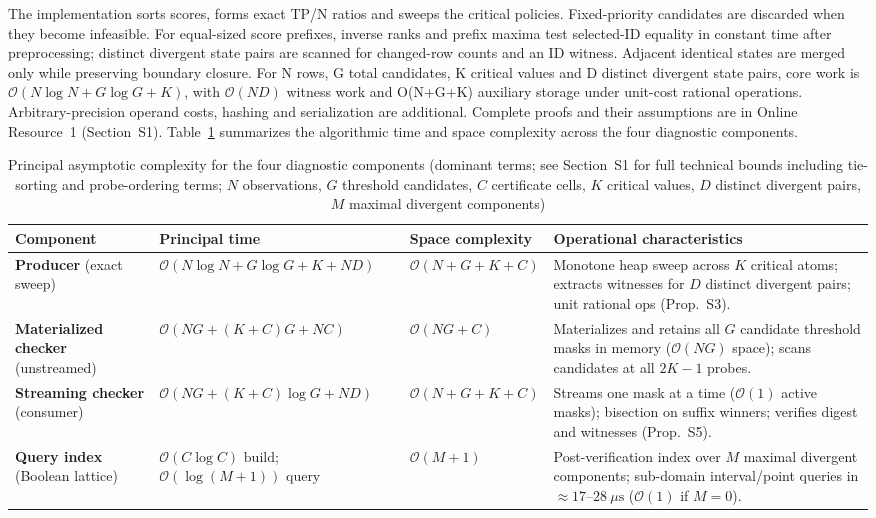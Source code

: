 \documentclass[11pt,a4paper]{article}
\begin{document}
The implementation sorts scores, forms exact TP/N ratios and sweeps the critical policies. Fixed-priority candidates are discarded when they become infeasible. For equal-sized score prefixes, inverse ranks and prefix maxima test selected-ID equality in constant time after preprocessing; distinct divergent state pairs are scanned for changed-row counts and an ID witness. Adjacent identical states are merged only while preserving boundary closure. For N rows, G total candidates, K critical values and D distinct divergent state pairs, core work is $\mathcal{O}(N \log N + G \log G + K)$, with $\mathcal{O}(ND)$ witness work and O(N+G+K) auxiliary storage under unit-cost rational operations. Arbitrary-precision operand costs, hashing and serialization are additional. Complete proofs and their assumptions are in Online Resource~1 (Section~S1). Table~\ref{tab:3} summarizes the algorithmic time and space complexity across the four diagnostic components.

\begin{table}[!htbp]
\caption{Principal asymptotic complexity for the four diagnostic components (dominant terms; see Section~S1 for full technical bounds including tie-sorting and probe-ordering terms; $N$ observations, $G$ threshold candidates, $C$ certificate cells, $K$ critical values, $D$ distinct divergent pairs, $M$ maximal divergent components)}\label{tab:3}
\centering
\footnotesize
\setlength{\tabcolsep}{3pt}
\renewcommand{\arraystretch}{1.2}
\begin{tabularx}{\textwidth}{@{} >{\raggedright\arraybackslash}p{2.4cm} >{\raggedright\arraybackslash}p{3.4cm} >{\raggedright\arraybackslash}p{2.1cm} >{\raggedright\arraybackslash}X @{}}
\toprule
\textbf{Component} & \textbf{Principal time} & \textbf{Space complexity} & \textbf{Operational characteristics} \\
\midrule
\textbf{Producer} (exact sweep) & $\mathcal{O}(N \log N + G \log G + K + ND)$ & $\mathcal{O}(N + G + K + C)$ & Monotone heap sweep across $K$ critical atoms; extracts witnesses for $D$ distinct divergent pairs; unit rational ops (Prop.~S3). \\
\midrule
\textbf{Materialized checker} (unstreamed) & $\mathcal{O}(NG + (K + C)G + NC)$ & $\mathcal{O}(NG + C)$ & Materializes and retains all $G$ candidate threshold masks in memory ($\mathcal{O}(NG)$ space); scans candidates at all $2K-1$ probes. \\
\midrule
\textbf{Streaming checker} (consumer) & $\mathcal{O}(NG + (K + C) \log G + ND)$ & $\mathcal{O}(N + G + K + C)$ & Streams one mask at a time ($\mathcal{O}(1)$ active masks); bisection on suffix winners; verifies digest and witnesses (Prop.~S5). \\
\midrule
\textbf{Query index} (Boolean lattice) & $\mathcal{O}(C \log C)\text{ build}$; $\mathcal{O}(\log(M + 1))\text{ query}$ & $\mathcal{O}(M + 1)$ & Post-verification index over $M$ maximal divergent components; sub-domain interval/point queries in $\approx 17\text{--}28\ \mu\text{s}$ ($\mathcal{O}(1)$ if $M=0$). \\
\bottomrule
\end{tabularx}
\end{table}
\FloatBarrier
\end{document}
